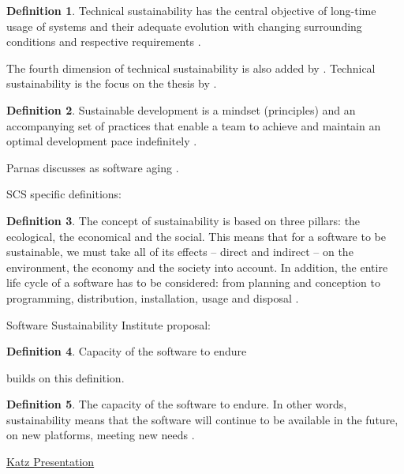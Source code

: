 \documentclass[letterpaper, cleveref]{lipics-v2019}
\theoremstyle{definition}
\newtheorem{defn}{Definition}
\begin{document}
\begin{defn}
  \noindent Technical sustainability has the central objective of long-time
  usage of systems and their adequate evolution with changing surrounding
  conditions and respective requirements \citep{PenzenstadlerAndHenning2013}.
\end{defn}

The fourth dimension of technical sustainability is also added by
\citep{WolframEtAl2017}.  Technical sustainability is the focus on the
thesis by \citet{Hygerth2016}.

\begin{defn}
  \noindent Sustainable development is a mindset (principles) and an
  accompanying set of practices that enable a team to achieve and maintain
  an optimal development pace indefinitely \citep{Tate2005}.
\end{defn}

Parnas discusses as software aging \citep{Parnas1994a}.

SCS specific definitions:

\begin{defn}
  The concept of sustainability is based on three pillars: the ecological, the
  economical and the social. This means that for a software to be sustainable,
  we must take all of its effects -- direct and indirect -- on the environment,
  the economy and the society into account. In addition, the entire life cycle
  of a software has to be considered: from planning and conception to
  programming, distribution, installation, usage and disposal \citep{Heine2017}.
\end{defn}

Software Sustainability Institute proposal:

\begin{defn}
Capacity of the software to endure
\end{defn}

\citet{Katz2016} builds on this definition.

\begin{defn}
  \noindent The capacity of the software to endure. In other words,
  sustainability means that the software will continue to be available in
  the future, on new platforms, meeting new needs \citep{Katz2016}.
\end{defn}

\href{https://collegeville.github.io/CW3S19/WorkshopResources/Presentations/4-5-Katz_data-driven-software-sustainability.pdf}
{Katz Presentation}
\end{document}
